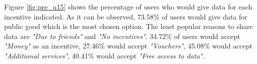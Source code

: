 Figure \ref{fig:pre_q15} shows the percentage of users who would give data for each incentive indicated. As it can be observed, 73.58\% of users would give data for public good which is the most chosen option. The least popular reasons to share data are \textit{"Due to friends"} and \textit{"No incentives"}. 34.72\% of users would accept \textit{"Money"} as an incentive, 27.46\% would accept \textit{"Vouchers"}, 45.08\% would accept \textit{"Additional services"}, 40.41\% would accept \textit{"Free access to data"}.


\begin{figure}[htp]
\hspace{1em}
\newline
{}\hspace{1em}

\end{figure}
